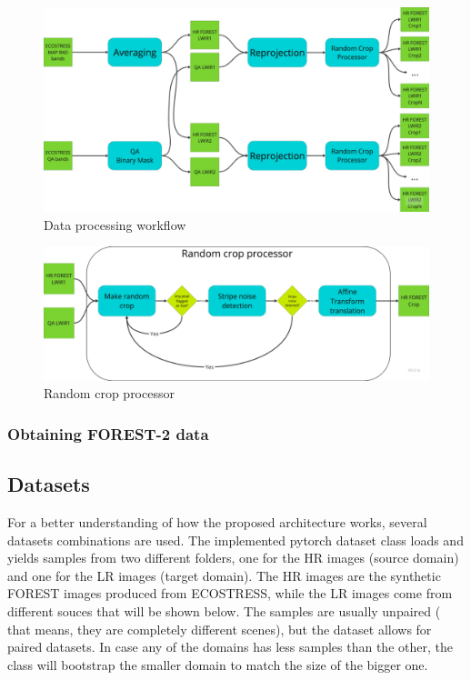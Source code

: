    
        \begin{figure}[h!]
            \centering
            \includegraphics[width=\linewidth]{Includes/5-data_processing_flow_chart.pdf}
            \caption{Data processing workflow}
            \label{fig:5-data_processing_flow_chart}
        \end{figure}

        \begin{figure}[h!]
            \centering
            \includegraphics[width=\linewidth]{Includes/5-random_crop_processor.pdf}
            \caption{Random crop processor}
            \label{fig:5-random_crop_processor}
        \end{figure}

    
        
    \subsubsection{Obtaining FOREST-2 data}


    
    \subsection{Datasets}

        For a better understanding of how the proposed architecture works, several datasets combinations are used. 
        The implemented pytorch dataset class loads and yields samples from two different folders, one for the HR images (source domain) and one for the LR images (target domain). 
        The HR images are the synthetic FOREST images produced from ECOSTRESS, while the LR images come from different souces that will be shown below.
        The samples are usually unpaired ( that means, they are completely different scenes), but the dataset allows for paired datasets. 
        In case any of the domains has less samples than the other, the class will bootstrap the smaller domain to match the size of the bigger one.
        


